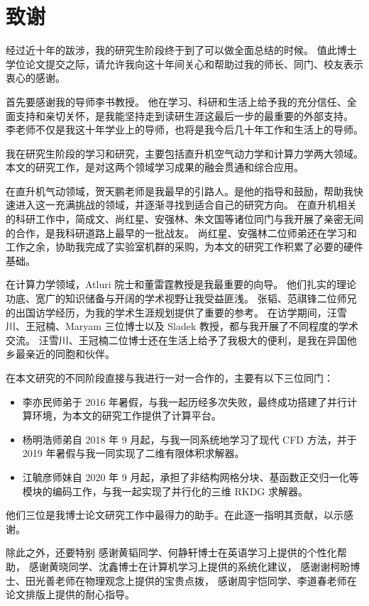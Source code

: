 \chapter{致谢}

经过近十年的跋涉，我的研究生阶段终于到了可以做全面总结的时候。
值此博士学位论文提交之际，请允许我向这十年间关心和帮助过我的师长、同门、校友表示衷心的感谢。

首先要感谢我的导师李书教授。
他在学习、科研和生活上给予我的充分信任、全面支持和亲切关怀，是我能坚持走到读研生涯这最后一步的最重要的外部支持。
李老师不仅是我这十年学业上的导师，也将是我今后几十年工作和生活上的导师。

我在研究生阶段的学习和研究，主要包括直升机空气动力学和计算力学两大领域。
本文的研究工作，是对这两个领域学习成果的融会贯通和综合应用。

在直升机气动领域，贺天鹏老师是我最早的引路人。是他的指导和鼓励，帮助我快速进入这一充满挑战的领域，并逐渐寻找到适合自己的研究方向。
在直升机相关的科研工作中，简成文、尚红星、安强林、朱文国等诸位同门与我开展了亲密无间的合作，是我科研道路上最早的一批战友。
尚红星、安强林二位师弟还在学习和工作之余，协助我完成了实验室机群的采购，为本文的研究工作积累了必要的硬件基础。

在计算力学领域，Atluri 院士和董雷霆教授是我最重要的向导。
他们扎实的理论功底、宽广的知识储备与开阔的学术视野让我受益匪浅。
张韬、范祺锋二位师兄的出国访学经历，为我的学术生涯规划提供了重要的参考。
在访学期间，汪雪川、王冠楠、Maryam 三位博士以及 Sladek 教授，都与我开展了不同程度的学术交流。
汪雪川、王冠楠二位博士还在生活上给予了我极大的便利，是我在异国他乡最亲近的同胞和伙伴。

在本文研究的不同阶段直接与我进行一对一合作的，主要有以下三位同门：
\begin{itemize}
\item 李亦民师弟于 2016 年暑假，与我一起历经多次失败，最终成功搭建了并行计算环境，为本文的研究工作提供了计算平台。
\item 杨明浩师弟自 2018 年 9 月起，与我一同系统地学习了现代 CFD 方法，并于 2019 年暑假与我一同实现了二维有限体积求解器。
\item 江毓彦师妹自 2020 年 9 月起，承担了非结构网格分块、基函数正交归一化等模块的编码工作，与我一起实现了并行化的三维 RKDG 求解器。
\end{itemize}
他们三位是我博士论文研究工作中最得力的助手。在此逐一指明其贡献，以示感谢。

除此之外，还要特别
感谢黄韬同学、何静轩博士在英语学习上提供的个性化帮助，
感谢黄晓同学、沈鑫博士在计算机学习上提供的系统化建议，
感谢谢柯盼博士、田光善老师在物理观念上提供的宝贵点拨，
感谢周宇恺同学、李道春老师在论文排版上提供的耐心指导。

